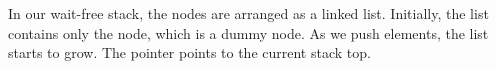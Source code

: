 \documentclass{llncs}
\begin{document}
\begin{comment}
\begin{figure}[!htb]
\begin{center}
\texttt{[image: list]}
\caption{The underlying data structure of the stack with  and  nodes \label{fig:wfstack}}
\end{center}
\end{figure}
\end{comment}
In our wait-free stack, the nodes are arranged as a linked list. Initially, the list contains 
only the  node, which is a dummy node. As we push elements, the list starts to grow. 
The  pointer points to the current stack top. 


\begin{comment}
\begin{algorithm}
\scriptsize
 \\
  \\

\textbf{WFstack}() \{ \\
	\hspace{5mm}   \\
	\hspace{5mm}   \\
	.... \\
\}
\caption{Class WFStack \label{alg:wfs}}
\end{algorithm}
\end{comment}

\normalsize
\begin{comment}
\begin{algorithm}


\SetAlgoLined



\textbf{WFstack}(){}\\
		\hspace{5mm}   \\
		\hspace{5mm}   \\
		\hspace{5mm}   \\
		\hspace{5mm}   \\
		\hspace{5mm}   \\
		\hspace{5mm}   \\
		\hspace{5mm}    (\_)\\
		\hspace{5mm}    [\_]\\

		\hspace{5mm}\For{  0 ;   \_ ;   +1}
		 {
			\hspace{10mm} ,  \\
			\hspace{10mm} ,  \\
		 }

		\hspace{5mm}\\

\end{algorithm}
\end{comment}
\vspace{-4mm}
\end{document}
